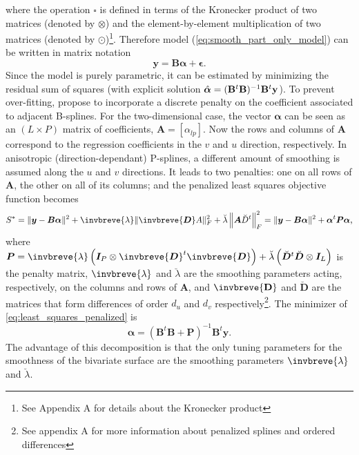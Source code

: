 where the operation $\square$ is defined in terms of the Kronecker product of two matrices (denoted by $\otimes$) and the element-by-element multiplication of two matrices (denoted by $\odot$)\footnote{See Appendix A for details about the Kronecker product}. Therefore model (\ref{eq:smooth_part_only_model}) can be written in matrix notation
\begin{equation}
    \boldsymbol{y} = \boldsymbol{B}\boldsymbol{\alpha} + \boldsymbol{\epsilon}
    \text{.}
    \label{eq:spline_model_mat_form}
\end{equation}
Since the model is purely parametric, it can be estimated by minimizing the residual sum of squares (with explicit solution $\Hat{\boldsymbol{\alpha}} = (\mathbf{B}^t\mathbf{B})^{-1}\mathbf{B}^t\mathbf{y}$). To prevent over-fitting, \textcite{eilers_flexible_1996} propose to incorporate a discrete penalty on the coefficient associated to adjacent B-splines. For the two-dimensional case, the vector $\boldsymbol{\alpha}$ can be seen as an  $(L \times P)$  matrix  of  coefficients, $\mathbf{A}=[\alpha_{lp}]$. Now the rows  and columns of $\mathbf{A}$ correspond to the regression coefficients in the $v$ and  $u$ direction, respectively. In anisotropic (direction-dependant) P-splines, a different amount of smoothing is assumed along the $u$ and $v$ directions. It leads to two penalties:  one on all rows of $\mathbf{A}$,  the other on all of its columns; and the penalized least squares objective function becomes \parencite{eilers_multivariate_2003}
\begin{equation}
    S^{*}=\|\boldsymbol{y}-\boldsymbol{B} \boldsymbol{\alpha}\|^{2}+\invbreve{\lambda}\|\invbreve{\boldsymbol{D}} A\|_{F}^{2}+\breve{\lambda}\left\|\boldsymbol{A} \breve{D}^{t}\right\|_{F}^{2}=\|\boldsymbol{y}-\boldsymbol{B} \boldsymbol{\alpha}\|^{2}+\boldsymbol{\alpha}^{t} \boldsymbol{P} \boldsymbol{\alpha}
    \text{,}
    \label{eq:least_squares_penalized}
\end{equation}
where $\boldsymbol{P}=\invbreve{\lambda}\left(\boldsymbol{I}_{P} \otimes \invbreve{\boldsymbol{D}}^{t} \invbreve{\boldsymbol{D}}\right)+\breve{\lambda}\left(\breve{\boldsymbol{D}}^{t} \breve{\boldsymbol{D}} \otimes \boldsymbol{I}_{L}\right)$ is the penalty matrix, $\invbreve{\lambda}$ and $\breve{\lambda}$ are the smoothing parameters acting, respectively, on the columns and rows of $\mathbf{A}$, and $\invbreve{\mathbf{D}}$ and $\breve{\mathbf{D}}$ are the matrices that form differences of order $d_u$ and $d_v$ respectively\footnote{See appendix A for more information about penalized splines and ordered differences}. The minimizer of \ref{eq:least_squares_penalized} is 
\begin{equation}
    \widehat{\boldsymbol{\alpha}}=\left(\boldsymbol{B}^{t} \boldsymbol{B}+\boldsymbol{P}\right)^{-1} \boldsymbol{B}^{t} \boldsymbol{y}
    \text{.}
\end{equation}
The advantage of this decomposition is that the only tuning parameters for the smoothness of the bivariate surface are the smoothing parameters $\invbreve{\lambda}$ and $\breve{\lambda}$.

